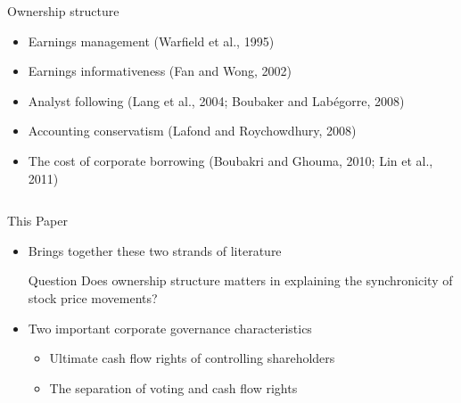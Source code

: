 \documentclass{beamer}
\begin{document}
\begin{frame}
\begin{columns}
\begin{block}{\footnotesize Ownership structure }
\begin{itemize}
\item  Earnings management (Warfield et al., 1995)
\item  Earnings informativeness (Fan and Wong, 2002)
\item  Analyst following (Lang et al.,
2004; Boubaker and Labégorre, 2008)
\item  Accounting conservatism
(Lafond and Roychowdhury, 2008)
\item  The cost of corporate
borrowing (Boubakri and Ghouma, 2010; Lin et al., 2011)
		\end{itemize}
	\end{block}
\end{columns}




\end{frame}

\begin{frame}{This Paper}
	\begin{itemize}
		\item Brings together these two strands of literature
		\begin{block}{Question}
			Does ownership structure matters in explaining the synchronicity of stock price movements?
		\end{block}
	\item  Two
	important corporate governance characteristics
	\begin{itemize}
		\item  Ultimate cash flow rights of controlling shareholders
		\item The separation of voting and
		cash flow rights
	\end{itemize}
	\end{itemize}
\end{frame}
\end{document}

